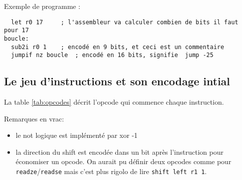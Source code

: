 \documentclass[architecture]{compas2018}
\begin{document}
Exemple de programme :
\begin{verbatim}
  let r0 17     ; l'assembleur va calculer combien de bits il faut pour 17
boucle:	
  sub2i r0 1    ; encodé en 9 bits, et ceci est un commentaire
  jumpif nz boucle  ; encodé en 16 bits, signifie  jump -25 
\end{verbatim}

\subsection{Le jeu d'instructions et son encodage intial}



La table \ref{tab:opcodes} décrit l'opcode qui commence chaque instruction.

Remarques en vrac: 
\begin{itemize}
\item le not logique est implémenté par xor -1
\item la direction du shift est encodée dans un bit après l'instruction pour économiser un opcode. On aurait pu définir deux opcodes comme pour \texttt{readze}/\texttt{readse} mais c'est plus rigolo de lire \texttt{shift left r1 1}.
\end{itemize}
\end{document}
